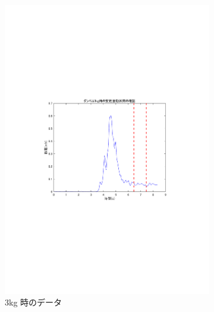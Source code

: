 \documentclass[dvipdfmx, titlepage, t]{jsarticle}
\begin{document}
\begin{figure}[H]
\begin{subfigure}[b]{0.32\linewidth}
        \includegraphics[trim=90 250 100 250 clip,width=\linewidth]{figure/check_3kg.pdf}
        \caption{3kg 時のデータ}
        \label{fig:chb}
    \end{subfigure}
    \hfill
    \begin{subfigure}[b]{0.32\linewidth}
        \centering

\end{subfigure}
\end{figure}
\end{document}
